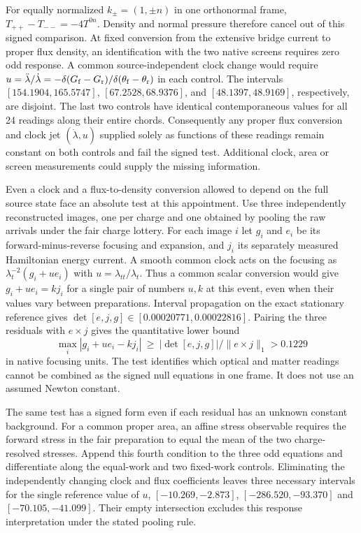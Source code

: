 For equally normalized $k_\pm=(1,\pm n)$ in one orthonormal frame,
$T_{++}-T_{--}=-4T^{0n}$. Density and normal pressure therefore
cancel out of this signed comparison. At fixed conversion from the
extensive bridge current to proper flux density, an identification
with the two native screens requires zero odd response. A common
source-independent clock change would require
$u=\ddot\lambda/\dot\lambda=-\delta(G_{\rm f}-G_{\rm r})/
\delta(\theta_{\rm f}-\theta_{\rm r})$ in each control. The intervals
$[154.1904,165.5747]$, $[67.2528,68.9376]$, and
$[48.1397,48.9169]$, respectively, are disjoint. The last two
controls have identical contemporaneous values for all 24 readings
along their entire chords. Consequently any proper flux conversion
and clock jet $(\dot\lambda,u)$ supplied solely as functions of
these readings remain constant on both controls and fail the signed
test. Additional clock, area or screen measurements could supply the
missing information.

Even a clock and a flux-to-density conversion allowed to depend on the
full source state face an absolute test at this appointment. Use three
independently reconstructed images, one per charge and one obtained by
pooling the raw arrivals under the fair charge lottery. For each image
$i$ let $g_i$ and $e_i$ be its forward-minus-reverse focusing and
expansion, and $j_i$ its separately measured Hamiltonian energy current.
A smooth common clock acts on the focusing as
$\lambda_t^{-2}(g_i+u e_i)$ with $u=\lambda_{tt}/\lambda_t$. Thus a
common scalar conversion would give $g_i+u e_i=k j_i$ for a single
pair of numbers $u,k$ at this event, even when their values vary between
preparations. Interval propagation on the exact stationary reference
gives $\det[e,j,g]\in[0.00020771,0.00022816]$. Pairing the three
residuals with $e\times j$ gives the quantitative lower bound
\[
 \max_i |g_i+u e_i-kj_i|\ \ge\
 |\det[e,j,g]|/\|e\times j\|_1 >0.1229
\]
in native focusing units. The test identifies which optical and matter
readings cannot be combined as the signed null equations in one frame.
It does not use an assumed Newton constant.

The same test has a signed form even if each residual has an unknown
constant background. For a common proper area, an affine stress observable
requires the forward stress in the fair preparation to equal the mean of
the two charge-resolved stresses. Append this fourth condition to the three
odd equations and differentiate along the equal-work and two fixed-work
controls. Eliminating the independently changing clock and flux coefficients
leaves three necessary intervals for the single reference value of $u$,
$[-10.269,-2.873]$, $[-286.520,-93.370]$ and $[-70.105,-41.099]$.
Their empty intersection excludes this response interpretation under the
stated pooling rule.

